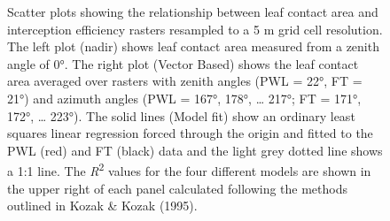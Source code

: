 \documentclass[
  letterpaper,
  DIV=11,
  numbers=noendperiod]{scrartcl}
\begin{document}
\begin{figure}[H]


\caption{\label{fig-lca-vs-ip}Scatter plots showing the relationship
between leaf contact area and interception efficiency rasters resampled
to a 5 m grid cell resolution. The left plot (nadir) shows leaf contact
area measured from a zenith angle of 0°. The right plot (Vector Based)
shows the leaf contact area averaged over rasters with zenith angles
(PWL = 22°, FT = 21°) and azimuth angles (PWL = 167°, 178°, \ldots{}
217°; FT = 171°, 172°, \ldots{} 223°). The solid lines (Model fit) show
an ordinary least squares linear regression forced through the origin
and fitted to the PWL (red) and FT (black) data and the light grey
dotted line shows a 1:1 line. The \emph{R}\textsuperscript{2} values for
the four different models are shown in the upper right of each panel
calculated following the methods outlined in Kozak \& Kozak (1995).}

\end{figure}%
\end{document}
